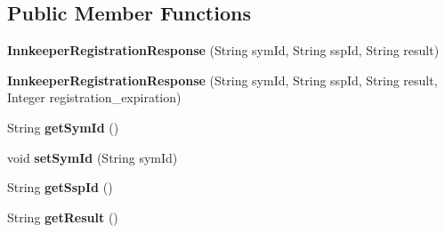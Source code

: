 \subsection*{Public Member Functions}
\begin{DoxyCompactItemize}
\item 
\mbox{\label{classeu_1_1h2020_1_1symbiote_1_1ssp_1_1model_1_1InnkeeperRegistrationResponse_a3129540026a3a15133c4bb526a6b5cf8}} 
{\bfseries Innkeeper\+Registration\+Response} (String sym\+Id, String ssp\+Id, String result)
\item 
\mbox{\label{classeu_1_1h2020_1_1symbiote_1_1ssp_1_1model_1_1InnkeeperRegistrationResponse_a69c591adf3897cce024b663ba486ec3c}} 
{\bfseries Innkeeper\+Registration\+Response} (String sym\+Id, String ssp\+Id, String result, Integer registration\+\_\+expiration)
\item 
\mbox{\label{classeu_1_1h2020_1_1symbiote_1_1ssp_1_1model_1_1InnkeeperRegistrationResponse_a8ea6adc8a93206dd4eb58a8b65070951}} 
String {\bfseries get\+Sym\+Id} ()
\item 
\mbox{\label{classeu_1_1h2020_1_1symbiote_1_1ssp_1_1model_1_1InnkeeperRegistrationResponse_a9a76e820a3c1261e1b9291693d4b9590}} 
void {\bfseries set\+Sym\+Id} (String sym\+Id)
\item 
\mbox{\label{classeu_1_1h2020_1_1symbiote_1_1ssp_1_1model_1_1InnkeeperRegistrationResponse_a7f287970ca665f5646ee0327e3058796}} 
String {\bfseries get\+Ssp\+Id} ()
\item 
\mbox{\label{classeu_1_1h2020_1_1symbiote_1_1ssp_1_1model_1_1InnkeeperRegistrationResponse_a45e554c4000383affe629d68d00f00c8}} 
String {\bfseries get\+Result} ()
\item 
\mbox{\label{classeu_1_1h2020_1_1symbiote_1_1ssp_1_1model_1_1InnkeeperRegistrationResponse_a340c0cd1bf777ff4a4f746e0c1875918}} 

\end{DoxyCompactItemize}
